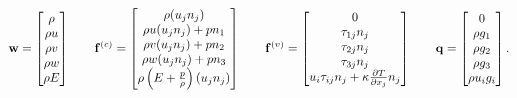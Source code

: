 \documentclass[oneside,a4paper,11pt]{report}
\begin{document}
\begin{equation}
\mathbf{w} = \begin{bmatrix} \rho \\ \rho u \\ \rho v \\ \rho w \\ \rho E \end{bmatrix}  \qquad
\mathbf{f}^{(c)} = \begin{bmatrix} \rho (u_j n_j) \\ \rho u (u_j n_j) + p n_1 \\ \rho v (u_j n_j) + p n_2 \\ \rho w (u_j n_j) + p n_3 \\ \rho \left (E + \frac{p}{\rho} \right) (u_j n_j) \end{bmatrix} \qquad
\mathbf{f}^{(v)} = \begin{bmatrix} 0 \\ \tau_{1j}n_j \\ \tau_{2j}n_j \\ \tau_{3j}n_j \\ u_i \tau_{ij}n_j +  \kappa \frac{\partial T}{\partial x_j} n_j \end{bmatrix} \qquad
\mathbf{q} = \begin{bmatrix} 0 \\ \rho g_1 \\ \rho g_2 \\ \rho g_3 \\  \rho u_i g_i \end{bmatrix}.
\end{equation} 
\end{document}
